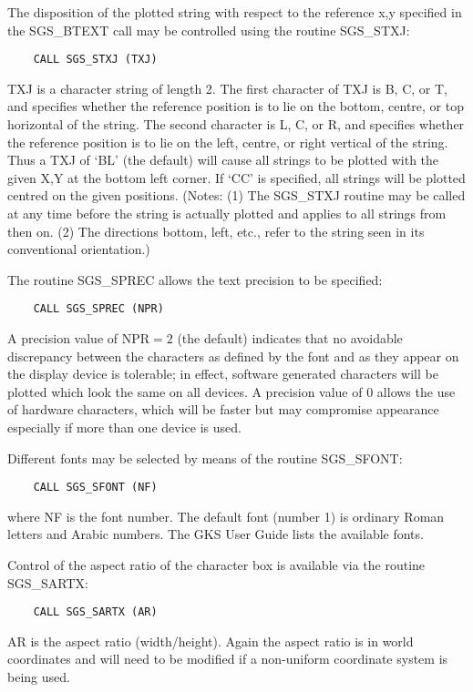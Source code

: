 The disposition of the plotted string with respect to
the reference x,y
specified in the SGS\_BTEXT call may be controlled using the
routine SGS\_STXJ:
\begin{verbatim}
    CALL SGS_STXJ (TXJ)
\end{verbatim}
TXJ is a character string of length 2.  The first character of TXJ
is B, C, or T, and specifies whether the reference position is to lie
on the bottom, centre, or top horizontal of the string.  The second
character is L, C, or R, and specifies whether the reference position
is to lie on the left, centre, or right vertical of the string.  Thus
a TXJ of `BL' (the default) will cause all strings to be plotted
with the given X,Y at the bottom left corner.  If `CC' is specified,
all strings will be plotted centred on the given
positions.  (Notes:  (1) The
SGS\_STXJ routine may be called at any time before the string is actually
plotted and applies to all strings from then on.  (2) The directions
bottom, left, etc., refer to the string seen in its conventional
orientation.)

The routine SGS\_SPREC allows the text precision to be specified:
\begin{verbatim}
    CALL SGS_SPREC (NPR)
\end{verbatim}
A precision value of NPR$=2$ (the default) indicates that no avoidable
discrepancy between the characters as defined by the font and as
they appear on the display device is tolerable;  in effect, software
generated characters will be plotted which look the same on all
devices.  A precision value of 0 allows the use of hardware
characters, which will be faster but may compromise appearance 
especially if more than one device is used.

Different fonts may 
be selected by means of the routine SGS\_SFONT:
\begin{verbatim}
    CALL SGS_SFONT (NF)
\end{verbatim}
where NF is the font number.  The default font (number 1) is ordinary Roman
letters and Arabic numbers.  The GKS User Guide lists the available fonts.

Control of the aspect ratio of the character box is available
via the routine SGS\_SARTX:
\begin{verbatim}
    CALL SGS_SARTX (AR)
\end{verbatim}
AR is the aspect ratio (width/height).  Again the aspect ratio is in world
coordinates and will need to be modified if a non-uniform coordinate system
is being used.

